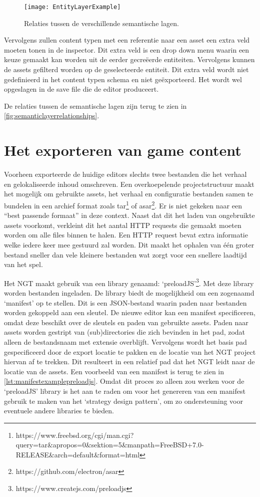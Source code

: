 \begin{wrapfigure}{r}{0.42\textwidth}
    \texttt{[image: EntityLayerExample]}
    \caption{Relaties tussen de verschillende semantische lagen.}
    \label{fig:semanticlayerrelationships}
    \centering
\end{wrapfigure}

Vervolgens zullen content typen met een referentie naar een asset een extra veld moeten tonen in de inspector. Dit extra veld is een drop down menu waarin een keuze gemaakt kan worden uit de eerder gecreëerde entiteiten. Vervolgens kunnen de assets gefilterd worden op de geselecteerde entiteit. Dit extra veld wordt niet gedefinieerd in het content typen schema en niet geëxporteerd. Het wordt wel opgeslagen in de save file die de editor produceert.

De relaties tussen de semantische lagen zijn terug te zien in \autoref{fig:semanticlayerrelationships}.

\clearpage
\section{Het exporteren van game content}
\label{sec:exportproces}
Voorheen exporteerde de huidige editors slechts twee bestanden die het verhaal en gelokaliseerde inhoud omschreven. Een overkoepelende projectstructuur maakt het mogelijk om gebruikte assets, het verhaal en configuratie bestanden samen te bundelen in een archief format zoals tar\footnote{https://www.freebsd.org/cgi/man.cgi?query=tar\&apropos=0\&sektion=5\&manpath=FreeBSD+7.0-RELEASE\&arch=default\&format=html} of asar\footnote{https://github.com/electron/asar}. Er is niet gekeken naar een “best passende formaat” in deze context. Naast dat dit het laden van ongebruikte assets voorkomt, verkleint dit het aantal HTTP requests die gemaakt moeten worden om alle files binnen te halen. Een HTTP request bevat extra informatie welke iedere keer mee gestuurd zal worden\cite{Fielding1999}. Dit maakt het ophalen van één groter bestand sneller dan vele kleinere bestanden wat zorgt voor een snellere laadtijd van het spel.

Het NGT maakt gebruik van een library genaamd: ‘preloadJS’\footnote{https://www.createjs.com/preloadjs}. Met deze library worden bestanden ingeladen. De library biedt de mogelijkheid om een zogenaamd ‘manifest’ op te stellen. Dit is een JSON-bestand waarin paden naar bestanden worden gekoppeld aan een sleutel. De nieuwe editor kan een manifest specificeren, omdat deze beschikt over de sleutels en paden van gebruikte assets. Paden naar assets worden gestript van (sub)directories die zich bevinden in het pad, zodat alleen de bestandsnaam met extensie overblijft. Vervolgens wordt het basis pad gespecificeerd door de export locatie te pakken en de locatie van het NGT project hiervan af te trekken. Dit resulteert in een relatief pad dat het NGT leidt naar de locatie van de assets. Een voorbeeld van een manifest is terug te zien in \autoref{lst:manifestexamplepreloadjs}. Omdat dit proces zo alleen zou werken voor de ‘preloadJS’ library is het aan te raden om voor het genereren van een manifest gebruik te maken van het ‘strategy design pattern’, om zo ondersteuning voor eventuele andere libraries te bieden.

